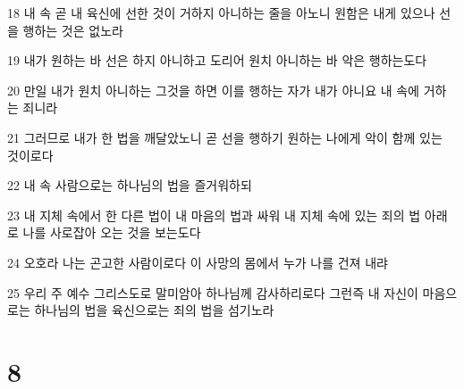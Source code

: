 \par 18 내 속 곧 내 육신에 선한 것이 거하지 아니하는 줄을 아노니 원함은 내게 있으나 선을 행하는 것은 없노라
\par 19 내가 원하는 바 선은 하지 아니하고 도리어 원치 아니하는 바 악은 행하는도다
\par 20 만일 내가 원치 아니하는 그것을 하면 이를 행하는 자가 내가 아니요 내 속에 거하는 죄니라
\par 21 그러므로 내가 한 법을 깨달았노니 곧 선을 행하기 원하는 나에게 악이 함께 있는 것이로다
\par 22 내 속 사람으로는 하나님의 법을 즐거워하되
\par 23 내 지체 속에서 한 다른 법이 내 마음의 법과 싸워 내 지체 속에 있는 죄의 법 아래로 나를 사로잡아 오는 것을 보는도다
\par 24 오호라 나는 곤고한 사람이로다 이 사망의 몸에서 누가 나를 건져 내랴
\par 25 우리 주 예수 그리스도로 말미암아 하나님께 감사하리로다 그런즉 내 자신이 마음으로는 하나님의 법을 육신으로는 죄의 법을 섬기노라

\chapter{8}

